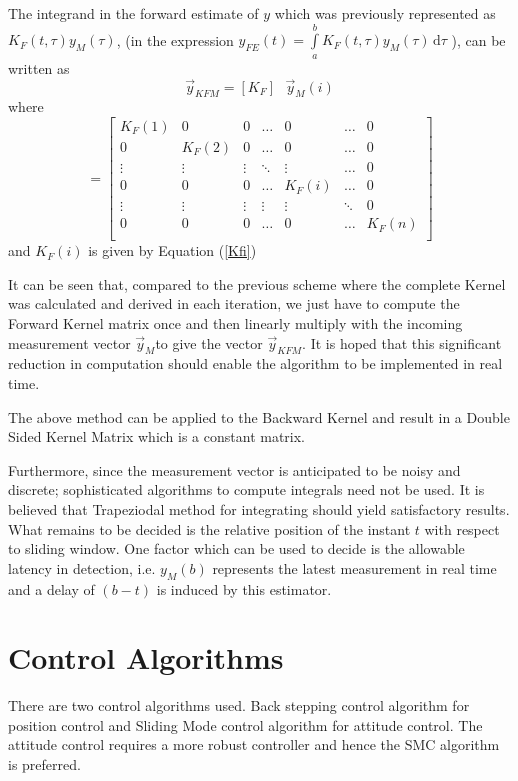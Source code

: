 \documentclass{article}
\begin{document}
The integrand in the forward estimate of $y$ which was previously represented as
$K_F(t,\tau) y_M(\tau)$, 
(in the expression $y_{FE}(t) =\int\limits_{a}^{b}K_F(t,\tau) y_M(\tau)\, \mathrm{d}\tau $ ), 
can be written as 
$$ \vec{y}_{KFM} = [K_F] \textrm{ } \vec{y}_M(i)$$
where 
\begin{equation*}
[K_F] =
\begin{bmatrix}
    K_F(1) &    0   &   0    & \dots  &    0    & \dots  &   0 \\
      0    & K_F(2) &   0    & \dots  &    0    & \dots  &   0 \\
    \vdots & \vdots & \vdots & \ddots & \vdots  & \dots  &   0 \\
      0    &   0    &   0    & \dots  &  K_F(i) & \dots  &   0 \\ 
    \vdots & \vdots & \vdots & \vdots & \vdots  & \ddots &   0 \\
      0    &   0    &   0    & \dots  &    0    & \dots  &   K_F(n) \\
\end{bmatrix}
\end{equation*}
and $K_F(i)$ is given by Equation (\ref{Kfi})

It can be seen that, compared to the previous scheme where the complete Kernel was calculated and derived in each iteration, we just have to compute the Forward Kernel matrix once and then linearly multiply with the incoming measurement vector $\vec{y}_M$to give the vector $\vec{y}_{KFM}$.
It is hoped that this significant reduction in computation should enable the algorithm to be implemented in real time. 

The above method can be applied to the Backward Kernel and result in a Double Sided Kernel Matrix which is a constant matrix.

Furthermore, since the measurement vector is anticipated to be noisy and discrete; sophisticated algorithms to compute integrals need not be used. It is believed that Trapeziodal method for integrating should yield satisfactory results. What remains to be decided is the relative position of the instant $t$ with respect to sliding window. One factor which can be used to decide is the allowable latency in detection, i.e. $y_M(b)$ represents the latest measurement in real time and a delay of $(b-t)$ is induced by this estimator.

\section{Control Algorithms}
There are two control algorithms used. Back stepping control algorithm for position control and Sliding Mode control algorithm for attitude control. The attitude control requires a more robust controller and hence the SMC algorithm is preferred. 
\end{document}
